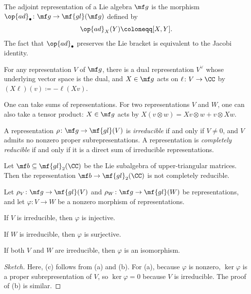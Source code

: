 \documentclass{article}
\begin{document}
\begin{example}[adjoint]
	The adjoint representation of a Lie algebra $\mf g$ is the morphism $\op{ad}_\bullet\colon\mf g\to\mf{gl}(\mf g)$ defined by
	\[\op{ad}_X(Y)\coloneqq[X,Y].\]
	The fact that $\op{ad}_\bullet$ preserves the Lie bracket is equivalent to the Jacobi identity.
\end{example}
\begin{example}
	For any representation $V$ of $\mf g$, there is a dual representation $V^\lor$ whose underlying vector space is the dual, and $X\in\mf g$ acts on $\ell\colon V\to\CC$ by $(X\ell)(v)\coloneqq-\ell(Xv)$.
\end{example}
\begin{example}
	One can take sums of representations. For two representations $V$ and $W$, one can also take a tensor product: $X\in\mf g$ acts by $X(v\otimes w)=Xv\otimes w+v\otimes Xw$.
\end{example}
\begin{definition}[irreducible]
	A representation $\rho\colon\mf g\to\mf{gl}(V)$ is \textit{irreducible} if and only if $V\ne0$, and $V$ admits no nonzero proper subrepresentations. A representation is \textit{completely reducible} if and only if it is a direct sum of irreducible representations.
\end{definition}
\begin{example}
	Let $\mf b\subseteq\mf{gl}_2(\CC)$ be the Lie subalgebra of upper-triangular matrices. Then the representation $\mf b\to\mf{gl}_2(\CC)$ is not completely reducible.
\end{example}
\begin{lemma}[Schur] \label{lem:schur}
	Let $\rho_V\colon\mf g\to\mf{gl}(V)$ and $\rho_W\colon\mf g\to\mf{gl}(W)$ be representations, and let $\varphi\colon V\to W$ be a nonzero morphism of representations.
	\begin{listalph}
		\item If $V$ is irreducible, then $\varphi$ is injective.
		\item If $W$ is irreducible, then $\varphi$ is surjective.
		\item If both $V$ and $W$ are irreducible, then $\varphi$ is an isomorphism.
	\end{listalph}
\end{lemma}
\begin{proof}[Sketch]
	Here, (c) follows from (a) and (b). For (a), because $\varphi$ is nonzero, $\ker\varphi$ is a proper subrepresentation of $V$, so $\ker\varphi=0$ because $V$ is irreducible. The proof of (b) is similar.
\end{proof}
\end{document}
